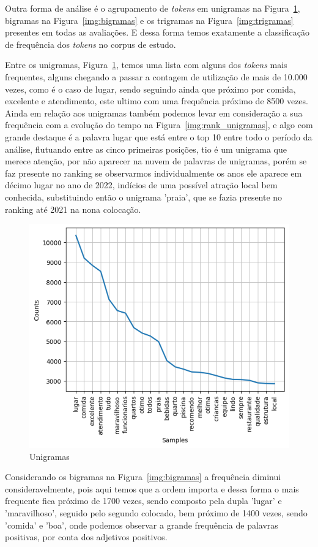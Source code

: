 Outra forma de análise é o agrupamento de \textit{tokens} em unigramas na Figura~\ref{img:unigramas}, bigramas na Figura~\ref{img:bigramas} e os trigramas na Figura~\ref{img:trigramas} presentes em todas as avaliações. E dessa forma temos exatamente a classificação de frequência dos \textit{tokens} no corpus de estudo.

Entre os unigramas, Figura~\ref{img:unigramas}, temos uma lista com alguns dos \textit{tokens} mais frequentes, alguns chegando a passar a contagem de utilização de mais de 10.000 vezes, como é o caso de lugar, sendo seguindo ainda que próximo por comida, excelente e atendimento, este ultimo com uma frequência próximo de 8500 vezes. Ainda em relação aos unigramas também podemos levar em consideração a sua frequência com a evolução do tempo na Figura~\ref{img:rank_unigramas}, e algo com grande destaque é a palavra lugar que está entre o top 10 entre todo o período da análise, flutuando entre as cinco primeiras posições, tio é um unigrama que merece atenção, por não aparecer na nuvem de palavras de unigramas, porém se faz presente no ranking se observarmos individualmente os anos ele aparece em décimo lugar no ano de 2022, indícios de uma possível atração local bem conhecida, substituindo então o unigrama 'praia', que se fazia presente no ranking até 2021 na nona colocação.

\begin{figure}
	\centering
	\includegraphics[width=.8\textwidth]{figs/exploratoria/unigramas.png}
	\caption{Unigramas}
	\label{img:unigramas}
\end{figure}

Considerando os bigramas na Figura~\ref{img:bigramas} a frequência diminui consideravelmente, pois aqui temos que a ordem importa e dessa forma o mais frequente fica próximo de 1700 vezes, sendo composto pela dupla 'lugar' e 'maravilhoso', seguido pelo segundo colocado, bem próximo de 1400 vezes, sendo 'comida' e 'boa', onde podemos observar a grande frequência de palavras positivas, por conta dos adjetivos positivos.

